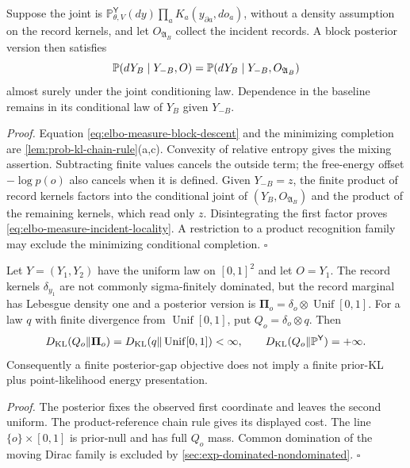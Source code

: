 Suppose the joint is
$\mathbb P^{\mathsf Y}_{\theta,V}(dy)\prod_a K_a(y_{\partial a},do_a)$,
without a density assumption on the record kernels, and let
$O_{\mathfrak A_B}$ collect the incident records. A block posterior version
then satisfies
\begin{equation}
\mathbb P(dY_B\mid Y_{-B},O)
=\mathbb P(dY_B\mid Y_{-B},O_{\mathfrak A_B})
\label{eq:elbo-measure-incident-locality}
\end{equation}
almost surely under the joint conditioning law. Dependence in the baseline
remains in its conditional law of $Y_B$ given $Y_{-B}$.

\noindent\emph{Proof.}
Equation \eqref{eq:elbo-measure-block-descent} and the minimizing completion
are \cref{lem:prob-kl-chain-rule}(a,c). Convexity of relative entropy gives
the mixing assertion. Subtracting finite values cancels the outside term;
the free-energy offset $-\log p(o)$ also cancels when it is defined.
Given $Y_{-B}=z$, the finite product of record kernels factors into the
conditional joint of $(Y_B,O_{\mathfrak A_B})$ and the product of the
remaining kernels, which read only $z$. Disintegrating the first factor
proves \eqref{eq:elbo-measure-incident-locality}. A restriction to a product
recognition family may exclude the minimizing conditional completion.
\hfill$\square$

Let $Y=(Y_1,Y_2)$ have the uniform law on $[0,1]^2$ and let $O=Y_1$.
The record kernels $\delta_{y_1}$ are not commonly sigma-finitely dominated,
but the record marginal has Lebesgue density one and a posterior version is
$\boldsymbol\Pi_o=\delta_o\otimes\operatorname{Unif}[0,1]$.
For a law $q$ with finite divergence from $\operatorname{Unif}[0,1]$, put
$Q_o=\delta_o\otimes q$. Then
\begin{equation}
D_{\mathrm{KL}}(Q_o\Vert\boldsymbol\Pi_o)
=D_{\mathrm{KL}}(q\Vert\operatorname{Unif}[0,1])<\infty,
\qquad
D_{\mathrm{KL}}(Q_o\Vert\mathbb P^{\mathsf Y})=+\infty.
\label{eq:elbo-nondominated-record-witness}
\end{equation}
Consequently a finite posterior-gap objective does not imply a finite
prior-KL plus point-likelihood energy presentation.

\noindent\emph{Proof.}
The posterior fixes the observed first coordinate and leaves the second
uniform. The product-reference chain rule gives its displayed cost.
The line $\{o\}\times[0,1]$ is prior-null and has full $Q_o$ mass.
Common domination of the moving Dirac family is excluded by
\cref{sec:exp-dominated-nondominated}. \hfill$\square$

